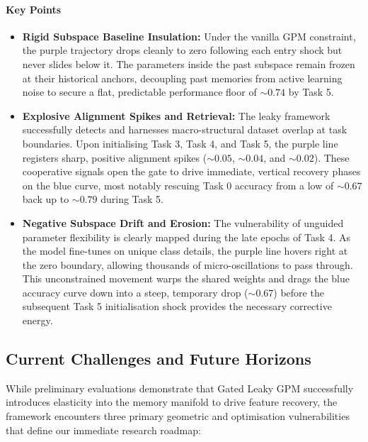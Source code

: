 \documentclass[10pt,a4paper]{article}
\begin{document}
		\paragraph{Key Points}
		\begin{itemize}
			\item \textbf{Rigid Subspace Baseline Insulation:} Under the vanilla GPM constraint, the purple trajectory drops cleanly to zero following each entry shock but never slides below it. The parameters inside the past subspace remain frozen at their historical anchors, decoupling past memories from active learning noise to secure a flat, predictable performance floor of $\sim 0.74$ by Task 5.
			\item \textbf{Explosive Alignment Spikes and Retrieval:} The leaky framework successfully detects and harnesses macro-structural dataset overlap at task boundaries. Upon initialising Task 3, Task 4, and Task 5, the purple line registers sharp, positive alignment spikes ($\sim 0.05$, $\sim 0.04$, and $\sim 0.02$). These cooperative signals open the gate to drive immediate, vertical recovery phases on the blue curve, most notably rescuing Task 0 accuracy from a low of $\sim 0.67$ back up to $\sim 0.79$ during Task 5.
			\item \textbf{Negative Subspace Drift and Erosion:} The vulnerability of unguided parameter flexibility is clearly mapped during the late epochs of Task 4. As the model fine-tunes on unique class details, the purple line hovers right at the zero boundary, allowing thousands of micro-oscillations to pass through. This unconstrained movement warps the shared weights and drags the blue accuracy curve down into a steep, temporary drop ($\sim 0.67$) before the subsequent Task 5 initialisation shock provides the necessary corrective energy.
		\end{itemize}
		
		\newpage
		\subsection{Current Challenges and Future Horizons}
		
		While preliminary evaluations demonstrate that Gated Leaky GPM successfully introduces elasticity into the memory manifold to drive feature recovery, the framework encounters three primary geometric and optimisation vulnerabilities that define our immediate research roadmap:
		
\end{document}
